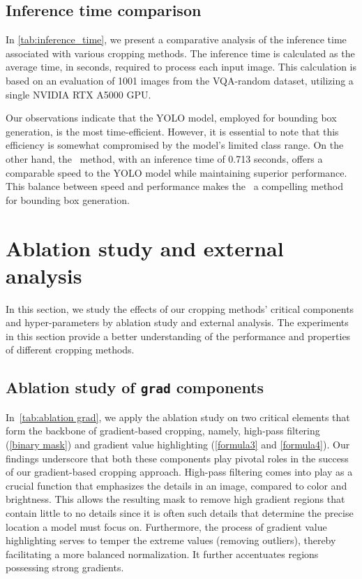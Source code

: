 \subsection{Inference time comparison}
In \autoref{tab:inference_time}, we present a comparative analysis of the inference time associated with various cropping methods. The inference time is calculated as the average time, in seconds, required to process each input image. This calculation is based on an evaluation of 1001 images from the VQA-random dataset, utilizing a single NVIDIA RTX A5000 GPU.

Our observations indicate that the YOLO model, employed for bounding box generation, is the most time-efficient. However, it is essential to note that this efficiency is somewhat compromised by the model's limited class range. On the other hand, the \grad~method, with an inference time of 0.713 seconds, offers a comparable speed to the YOLO model while maintaining superior performance. This balance between speed and performance makes the \grad~a compelling method for bounding box generation.


\section{Ablation study and external analysis}
In this section, we study the effects of our cropping methods' critical components and hyper-parameters by ablation study and external analysis. The experiments in this section provide a better understanding of the performance and properties of different cropping methods.




\subsection{Ablation study of \texttt{grad} components}






In~\autoref{tab:ablation grad}, we apply the ablation study on two critical elements that form the backbone of gradient-based cropping, namely, high-pass filtering (\autoref{binary mask}) and gradient value highlighting (\autoref{formula3} and \autoref{formula4}). Our findings underscore that both these components play pivotal roles in the success of our gradient-based cropping approach.
High-pass filtering comes into play as a crucial function that emphasizes the details in an image, compared to color and brightness. This allows the resulting mask to remove high gradient regions that contain little to no details since it is often such details that determine the precise location a model must focus on. Furthermore, the process of gradient value highlighting serves to temper the extreme values (removing outliers), thereby facilitating a more balanced normalization. It further accentuates regions possessing strong gradients.


